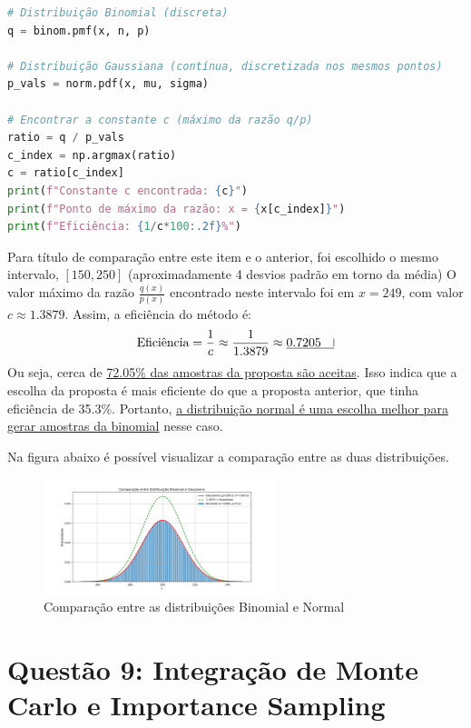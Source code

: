 \documentclass[12 pt]{article}
\begin{document}
\begin{enumerate}
\begin{tcolorbox}[colframe=black, title=Resposta:]
\begin{lstlisting}[language=Python]
# Distribuição Binomial (discreta)
q = binom.pmf(x, n, p)

# Distribuição Gaussiana (contínua, discretizada nos mesmos pontos)
p_vals = norm.pdf(x, mu, sigma)

# Encontrar a constante c (máximo da razão q/p)
ratio = q / p_vals
c_index = np.argmax(ratio)
c = ratio[c_index]
print(f"Constante c encontrada: {c}")
print(f"Ponto de máximo da razão: x = {x[c_index]}")
print(f"Eficiência: {1/c*100:.2f}%")
        \end{lstlisting}
    \end{tcolorbox}            
\end{enumerate}

\begin{tcolorbox}[colframe=black, title=Resposta (continuação):]
    Para título de comparação entre este item e o anterior, foi escolhido o mesmo intervalo, $[150, 250]$ (aproximadamente 4 desvios padrão em torno da média)
        O valor máximo da razão $\frac{q(x)}{p(x)}$ encontrado neste intervalo foi em $x = 249$, com valor \underline{$c \approx 1.3879$}. Assim, a eficiência do método é: 
        $$
        \text{Eficiência} = \frac{1}{c} \approx \frac{1}{1.3879} \approx \underline{0.7205 \quad \vline}
        $$
        Ou seja, cerca de \underline{72.05\% das amostras da proposta são aceitas}. Isso indica que a escolha da proposta é mais eficiente do que a proposta anterior, que tinha eficiência de 35.3\%. Portanto, \underline{a distribuição normal é uma escolha melhor para gerar amostras da binomial} nesse caso.

        Na figura abaixo é possível visualizar a comparação entre as duas distribuições.
\end{tcolorbox}

\begin{figure}[H]
    \centering
    \includegraphics[width=0.6\textwidth]{q8.png}
    \caption{Comparação entre as distribuições Binomial e Normal}
    \label{fig:comparacao_distribuicoes}
\end{figure}

\section*{Questão 9: Integração de Monte Carlo e Importance Sampling}
\end{document}
